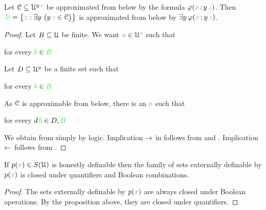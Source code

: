\begin{proposition}\label{prop_sh_exp_qe}
Let $\EuScript C\subseteq\EuScript U^{y\,{\color{green} z}}$ be approximated from below by the formula $\varphi({\color{brown} x}\,;y\,{\color{green} z})$.
Then ${\color{green}\EuScript D}=\big\{{\color{green} z}:\exists y\ \big(y\,{\color{green} z}\in\EuScript C\big)\big\}$ is approximated from below by $\exists y\,\varphi({\color{brown} x}\,;y\,{\color{green} z})$.
\end{proposition}

\begin{proof}
Let $B\subseteq\EuScript U$ be finite.
We want ${\color{brown} a}\in\EuScript U^{\color{brown} x}$ such that

\hfill for every ${\color{green} b}\in{\color{green}B}$


Let $D\subseteq\EuScript U^y$ be a finite set such that 

\hfill for every ${\color{green} b}\in{\color{green}B}$

As $\EuScript C$ is approximable from below, there is an ${\color{brown} a}$ such that

\hfill for every $d\,{\color{green} b}\in D,{\color{green} B}$


We obtain  from  simply by logic.
Implication $\rightarrow$ in  follows from  and .
Implication $\leftarrow$ follows from .
\end{proof}

\begin{corollary}
If $p({\color{brown} x})\in S(\EuScript U)$ is honestly definable then the family of sets externally definable by $p({\color{brown} x})$ is closed under quantifiers and Boolean combinations.
\end{corollary}

\begin{proof}
The sets externally definable by $p({\color{brown} x})$ are always closed under Boolean operations.
By the proposition above, they are closed under quantifiers.
\end{proof}


